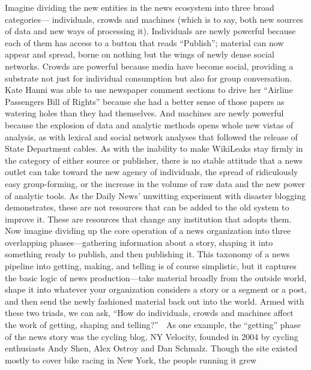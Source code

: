 Imagine dividing the new entities in the news ecosystem into three broad categories—
individuals, crowds and machines (which is to say, both new sources of
data and new ways of processing it). Individuals are newly powerful because each
of them has access to a button that reads ``Publish''; material can now appear and
spread, borne on nothing but the wings of newly dense social networks. Crowds
are powerful because media have become social, providing a substrate not just for
individual consumption but also for group conversation. Kate Hanni was able to
use newspaper comment sections to drive her ``Airline Passengers Bill of Rights''
because she had a better sense of those papers as watering holes than they had
themselves. And machines are newly powerful because the explosion of data and
analytic methods opens whole new vistas of analysis, as with lexical and social
network analyses that followed the release of State Department cables.
As with the inability to make WikiLeaks stay firmly in the category of either
source or publisher, there is no stable attitude that a news outlet can take toward
the new agency of individuals, the spread of ridiculously easy group-forming,
or the increase in the volume of raw data and the new power of analytic tools.
As the Daily News’ unwitting experiment with disaster blogging demonstrates,
these are not resources that can be added to the old system to improve it. These
are resources that change any institution that adopts them.
Now imagine dividing up the core operation of a news organization into three
overlapping phases—gathering information about a story, shaping it into something
ready to publish, and then publishing it. This taxonomy of a news pipeline
into getting, making, and telling is of course simplistic, but it captures the basic
logic of news production—take material broadly from the outside world, shape
it into whatever your organization considers a story or a segment or a post, and
then send the newly fashioned material back out into the world.
Armed with these two triads, we can ask, ``How do individuals, crowds and
machines affect the work of getting, shaping and telling?''
 As one example, the ``getting'' phase of the news story was the
cycling blog, NY Velocity, founded in 2004 by cycling enthusiasts
Andy Shen, Alex Ostroy and Dan Schmalz. Though the site existed
mostly to cover bike racing in New York, the people running it grew

